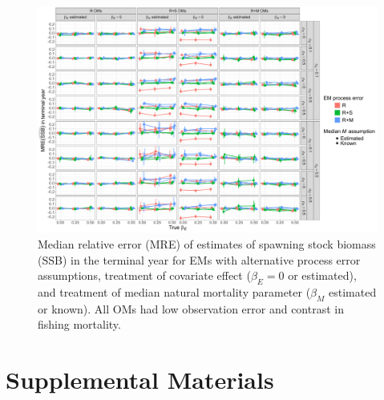 \documentclass[
  12pt,
]{article}
\begin{document}
\begin{landscape}
\begin{figure}
\begin{center}
\includegraphics[height = \textheight]{terminal_year_ssb_bias_main}
\end{center}
\caption{Median relative error (MRE) of estimates of spawning stock biomass (SSB) in the terminal year for EMs with alternative process error assumptions, treatment of covariate effect ($\beta_E = 0$ or estimated), and treatment of median natural mortality parameter ($\beta_M$ estimated or known). All OMs had low observation error and contrast in fishing mortality.}\label{terminal_ssb_bias}
\end{figure}
\end{landscape}

\hypertarget{supplemental-materials}{%
\section*{Supplemental Materials}\label{supplemental-materials}}

\setcounter{figure}{0}
\renewcommand\thefigure{S\arabic{figure}}
\end{document}
